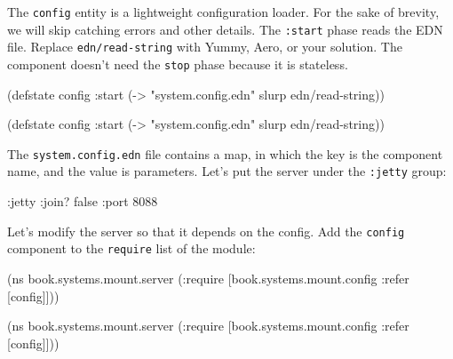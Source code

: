 The \verb|config| entity is a lightweight configuration loader. For the sake of brevity, we will skip catching errors and other details. The \verb|:start| phase reads the EDN file. Replace \texttt{edn/read\--string} with Yummy, Aero, or your solution. The component doesn't need the \verb|stop| phase because it is stateless.

\ifnarrow

\begin{english}
  \begin{clojure}
(defstate config
  :start
  (-> "system.config.edn"
      slurp
      edn/read-string))
  \end{clojure}
\end{english}

\else

\begin{english}
  \begin{clojure}
(defstate config
  :start
  (-> "system.config.edn" slurp edn/read-string))
  \end{clojure}
\end{english}

\fi

The \verb|system.config.edn| file contains a map, in which the key is the component name, and the value is parameters. Let's put the server under the \verb|:jetty| group:

\begin{english}
  \begin{clojure}
{:jetty {:join? false :port 8088}}
  \end{clojure}
\end{english}


Let's modify the server so that it depends on the config. Add the \verb|config| component to the \verb|require| list of the module:

\ifnarrow

\begin{english}
  \begin{clojure}
(ns book.systems.mount.server
 (:require
  [book.systems.mount.config
   :refer [config]]))
  \end{clojure}
\end{english}

\else

\begin{english}
  \begin{clojure}
(ns book.systems.mount.server
 (:require
  [book.systems.mount.config :refer [config]]))
  \end{clojure}
\end{english}

